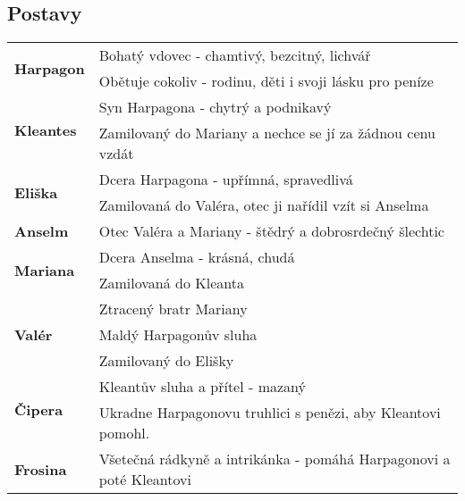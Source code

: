 \subsection*{Postavy}
\begin{tabularx}{\linewidth}{l|l}
    \multirow{2}{15em}{\textbf{Harpagon}} & Bohatý vdovec - chamtivý, bezcitný, lichvář                         \\
                                          & Obětuje cokoliv - rodinu, děti i svoji lásku pro peníze             \\
    \hline
    \multirow{2}{15em}{\textbf{Kleantes}} & Syn Harpagona - chytrý a podnikavý                                  \\
                                          & Zamilovaný do Mariany a nechce se jí za žádnou cenu vzdát           \\
    \hline
    \multirow{2}{15em}{\textbf{Eliška}}   & Dcera Harpagona - upřímná, spravedlivá                              \\
                                          & Zamilovaná do Valéra, otec ji nařídil vzít si Anselma               \\
    \hline
    \textbf{Anselm}                       & Otec Valéra a Mariany - štědrý a dobrosrdečný šlechtic              \\
    \hline
    \multirow{2}{15em}{\textbf{Mariana}}  & Dcera Anselma - krásná, chudá                                       \\
                                          & Zamilovaná do Kleanta                                               \\
    \hline
    \multirow{3}{15em}{\textbf{Valér}}    & Ztracený bratr Mariany                                              \\
                                          & Maldý Harpagonův sluha                                              \\
                                          & Zamilovaný do Elišky                                                \\
    \hline
    \multirow{2}{15em}{\textbf{Čipera}}   & Kleantův sluha a přítel - mazaný                                    \\
                                          & Ukradne Harpagonovu truhlici s penězi, aby Kleantovi pomohl.        \\
    \hline
    \textbf{Frosina}                      & Všetečná rádkyně a intrikánka - pomáhá Harpagonovi a poté Kleantovi \\
\end{tabularx}
